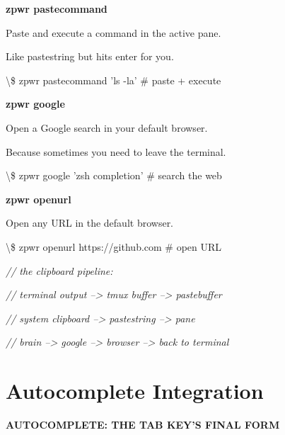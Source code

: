 \documentclass[11pt,a4paper,twoside]{book}
\begin{document}
\vspace{12pt}
{\bfseries\color{neonyellow} zpwr pastecommand}\vspace{4pt}

Paste and execute a command in the active pane.

Like pastestring but hits enter for you.

\begin{codebox}
\textbackslash{}\$ zpwr pastecommand 'ls -la'  \# paste + execute\\
\end{codebox}


\vspace{12pt}
{\bfseries\color{neonyellow} zpwr google}\vspace{4pt}

Open a Google search in your default browser.

Because sometimes you need to leave the terminal.

\begin{codebox}
\textbackslash{}\$ zpwr google 'zsh completion' \# search the web\\
\end{codebox}


\vspace{12pt}
{\bfseries\color{neonyellow} zpwr openurl}\vspace{4pt}

Open any URL in the default browser.

\begin{codebox}
\textbackslash{}\$ zpwr openurl https://github.com \# open URL\\
\end{codebox}

{\small\itshape\color{dimtext} // the clipboard pipeline:}

{\small\itshape\color{dimtext} //   terminal output --> tmux buffer --> pastebuffer}

{\small\itshape\color{dimtext} //   system clipboard --> pastestring --> pane}

{\small\itshape\color{dimtext} //   brain --> google --> browser --> back to terminal}


\vspace{16pt}

\section{Autocomplete Integration}


\vspace{10pt}
{\large\bfseries\color{neoncyan} AUTOCOMPLETE: THE TAB KEY'S FINAL FORM}\vspace{6pt}
\end{document}
